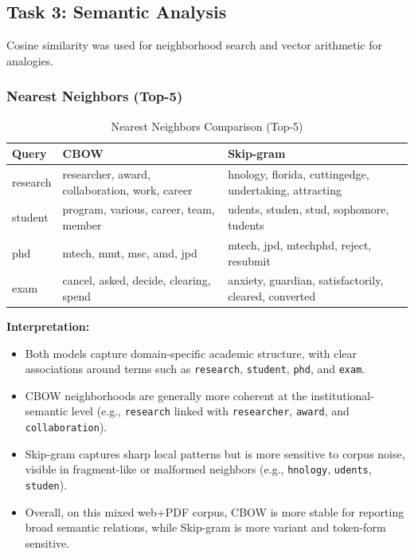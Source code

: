 \documentclass[11pt,a4paper]{article}
\begin{document}
\subsection{Task 3: Semantic Analysis}
Cosine similarity was used for neighborhood search and vector arithmetic for analogies.

\subsubsection{Nearest Neighbors (Top-5)}

\begin{table}[H]
\centering
\caption{Nearest Neighbors Comparison (Top-5)}
\small
\begin{tabular}{p{1.8cm} p{6.2cm} p{6.2cm}}
\toprule
\textbf{Query} & \textbf{CBOW} & \textbf{Skip-gram} \\
\midrule
research & researcher, award, collaboration, work, career & hnology, florida, cuttingedge, undertaking, attracting \\
student & program, various, career, team, member & udents, studen, stud, sophomore, tudents \\
phd & mtech, mmt, msc, amd, jpd & mtech, jpd, mtechphd, reject, resubmit \\
exam & cancel, asked, decide, clearing, spend & anxiety, guardian, satisfactorily, cleared, converted \\
\bottomrule
\end{tabular}
\end{table}

\textbf{Interpretation:}
\begin{itemize}[leftmargin=1.5em]
    \item Both models capture domain-specific academic structure, with clear associations around terms such as \texttt{research}, \texttt{student}, \texttt{phd}, and \texttt{exam}.
    \item CBOW neighborhoods are generally more coherent at the institutional-semantic level (e.g., \texttt{research} linked with \texttt{researcher}, \texttt{award}, and \texttt{collaboration}).
    \item Skip-gram captures sharp local patterns but is more sensitive to corpus noise, visible in fragment-like or malformed neighbors (e.g., \texttt{hnology}, \texttt{udents}, \texttt{studen}).
    \item Overall, on this mixed web+PDF corpus, CBOW is more stable for reporting broad semantic relations, while Skip-gram is more variant and token-form sensitive.
\end{itemize}
\end{document}
